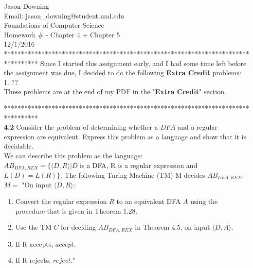 \documentclass[12pt]{article}
\begin{document}
\noindent
Jason Downing \\
Email: jason\_downing@student.uml.edu \\
Foundations of Computer Science \\
Homework \# - Chapter 4 + Chapter 5 \\
12/1/2016 \\

**********************************************************************************
Since I started this assignment early, and I had some time left before the assignment
was due, I decided to do the following \textbf{Extra Credit} problems: \\

1. ?? \\

These problems are at the end of my PDF in the "\textbf{Extra Credit}" section.

********************************************************************************** \\

\textbf{4.2} Consider the problem of determining whether a $DFA$ and a regular \\
expression are equivalent. Express this problem as a language and show that it is decidable. \\

We can describe this problem as the language: \\
$AB_{DFA,REX} = \{ \langle D, R \rangle | D $
is a DFA, R is a regular expression and $L(D) = L(R) \}$. The following Turing Machine (TM)
M decides $AB_{DFA,REX}$: \\

$M = $ "On input $\langle D, R \rangle$:
\begin{enumerate}
	\item Convert the regular expression $R$ to an equivalent DFA $A$ using the procedure that is given in Theorem 1.28.
	\item Use the TM $C$ for deciding $AB_{DFA,REX}$ in Theorem 4.5, on input $\langle D, A \rangle$.
	\item If R accepts, $accept$.
	\item If R rejects, $reject$."
\end{enumerate}
\end{document}
